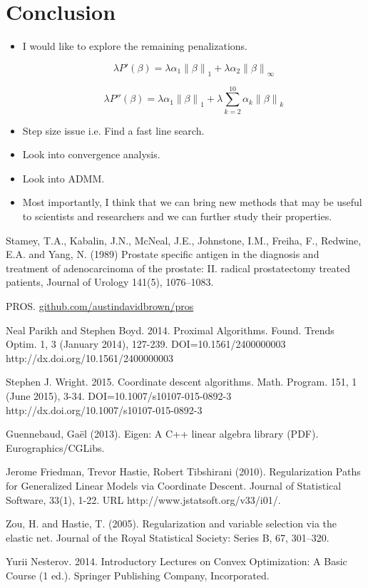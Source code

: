 \documentclass[10pt, reqno]{article}
\numberwithin{equation}{section}
\newcommand{\norm}[1]{\left\lVert#1\right\rVert}
\begin{document}
\newpage
\section*{Conclusion}

\begin{itemize}
\item I would like to explore the remaining penalizations.

\[
\lambda P'(\beta) = \lambda \alpha_1 \norm{\beta}_1 + \lambda \alpha_2 \norm{\beta}_\infty 
\]

\[
\lambda P''(\beta) = \lambda \alpha_1 \norm{\beta}_1 + \lambda \sum_{k = 2}^{10} \alpha_k \norm{\beta}_{k}
\]


\item Step size issue i.e. Find a fast line search.

\item Look into convergence analysis.

\item Look into ADMM.

\item Most importantly, I think that we can bring new methods that may be useful to scientists and researchers and we can further study their properties.
\end{itemize}

%
%
\newpage
\small
\begin{thebibliography}{1}

Stamey, T.A., Kabalin, J.N., McNeal, J.E., Johnstone, I.M., Freiha, F., Redwine, E.A. and Yang, N. (1989)
Prostate specific antigen in the diagnosis and treatment of adenocarcinoma of the prostate: II. radical prostatectomy treated patients, Journal of Urology 141(5), 1076–1083.

PROS. \href{https://github.com/austindavidbrown/pros}{github.com/austindavidbrown/pros}

Neal Parikh and Stephen Boyd. 2014. Proximal Algorithms. Found. Trends Optim. 1, 3 (January 2014), 127-239. DOI=10.1561/2400000003 http://dx.doi.org/10.1561/2400000003

Stephen J. Wright. 2015. Coordinate descent algorithms. Math. Program. 151, 1 (June 2015), 3-34. DOI=10.1007/s10107-015-0892-3 http://dx.doi.org/10.1007/s10107-015-0892-3

Guennebaud, Gaël (2013). Eigen: A C++ linear algebra library (PDF). Eurographics/CGLibs.

Jerome Friedman, Trevor Hastie, Robert Tibshirani (2010). Regularization Paths for Generalized Linear Models via Coordinate Descent. Journal of Statistical Software, 33(1), 1-22. URL http://www.jstatsoft.org/v33/i01/.

Zou, H. and Hastie, T. (2005). Regularization and variable selection via the elastic net. Journal of the Royal Statistical Society: Series B, 67, 301–320.

Yurii Nesterov. 2014. Introductory Lectures on Convex Optimization: A Basic Course (1 ed.). Springer Publishing Company, Incorporated.

\end{thebibliography}
\end{document}
